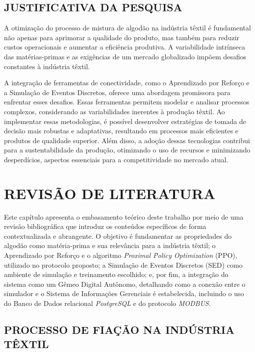 \documentclass[
    12pt,                %
    openright,           %
    oneside,             %
    a4paper,             %
    english,             %
    spanish,             %
    brazil               %
]{ufscar}
\begin{document}
\section{JUSTIFICATIVA DA PESQUISA}

A otimização do processo de mistura de algodão na indústria têxtil é fundamental não apenas para aprimorar a qualidade do produto, mas também para reduzir custos operacionais e aumentar a eficiência produtiva. A variabilidade intrínseca das matérias-primas e as exigências de um mercado globalizado impõem desafios constantes à indústria têxtil.

A integração de ferramentas de conectividade, como o Aprendizado por Reforço e a Simulação de Eventos Discretos, oferece uma abordagem promissora para enfrentar esses desafios. Essas ferramentas permitem modelar e analisar processos complexos, considerando as variabilidades inerentes à produção têxtil. Ao implementar essas metodologias, é possível desenvolver estratégias de tomada de decisão mais robustas e adaptativas, resultando em processos mais eficientes e produtos de qualidade superior. Além disso, a adoção dessas tecnologias contribui para a sustentabilidade da produção, otimizando o uso de recursos e minimizando desperdícios, aspectos essenciais para a competitividade no mercado atual.

\chapter{REVISÃO DE LITERATURA}

Este capítulo apresenta o embasamento teórico deste trabalho por meio de uma revisão bibliográfica que introduz os conteúdos específicos de forma contextualizada e abrangente. O objetivo é fundamentar as propriedades do algodão como matéria-prima e sua relevância para a indústria têxtil; o Aprendizado por Reforço e o algoritmo \textit{Proximal Policy Optimization} (PPO), utilizado no protocolo proposto; a Simulação de Eventos Discretos (SED) como ambiente de simulação e treinamento escolhido; e, por fim, a integração do sistema como um Gêmeo Digital Autônomo, detalhando como a conexão entre o simulador e o Sistema de Informações Gerenciais é estabelecida, incluindo o uso do Banco de Dados relacional \textit{PostgreSQL} e do protocolo \textit{MODBUS}.

\section{PROCESSO DE FIAÇÃO NA INDÚSTRIA TÊXTIL}
\end{document}
